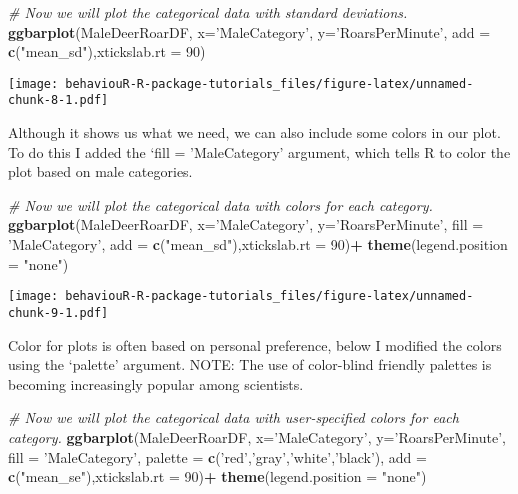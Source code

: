 \documentclass[]{book}
\newenvironment{Shaded}{\begin{snugshade}}{\end{snugshade}}
\newcommand{\CommentTok}[1]{\textcolor[rgb]{0.56,0.35,0.01}{\textit{#1}}}
\newcommand{\DataTypeTok}[1]{\textcolor[rgb]{0.13,0.29,0.53}{#1}}
\newcommand{\DecValTok}[1]{\textcolor[rgb]{0.00,0.00,0.81}{#1}}
\newcommand{\KeywordTok}[1]{\textcolor[rgb]{0.13,0.29,0.53}{\textbf{#1}}}
\newcommand{\NormalTok}[1]{#1}
\newcommand{\OperatorTok}[1]{\textcolor[rgb]{0.81,0.36,0.00}{\textbf{#1}}}
\newcommand{\StringTok}[1]{\textcolor[rgb]{0.31,0.60,0.02}{#1}}
\begin{document}
\begin{Shaded}
\begin{Highlighting}[]
\CommentTok{# Now we will plot the categorical data with standard deviations. }
\KeywordTok{ggbarplot}\NormalTok{(MaleDeerRoarDF, }\DataTypeTok{x=}\StringTok{'MaleCategory'}\NormalTok{, }\DataTypeTok{y=}\StringTok{'RoarsPerMinute'}\NormalTok{, }
          \DataTypeTok{add =} \KeywordTok{c}\NormalTok{(}\StringTok{"mean_sd"}\NormalTok{),}\DataTypeTok{xtickslab.rt =} \DecValTok{90}\NormalTok{)}
\end{Highlighting}
\end{Shaded}

\texttt{[image: behaviouR-R-package-tutorials\_files/figure-latex/unnamed-chunk-8-1.pdf]}

Although it shows us what we need, we can also include some colors in our plot. To do this I added the `fill = 'MaleCategory' argument, which tells R to color the plot based on male categories.

\begin{Shaded}
\begin{Highlighting}[]
\CommentTok{# Now we will plot the categorical data with colors for each category.}
\KeywordTok{ggbarplot}\NormalTok{(MaleDeerRoarDF, }\DataTypeTok{x=}\StringTok{'MaleCategory'}\NormalTok{, }\DataTypeTok{y=}\StringTok{'RoarsPerMinute'}\NormalTok{, }\DataTypeTok{fill =} \StringTok{'MaleCategory'}\NormalTok{,}
          \DataTypeTok{add =} \KeywordTok{c}\NormalTok{(}\StringTok{"mean_sd"}\NormalTok{),}\DataTypeTok{xtickslab.rt =} \DecValTok{90}\NormalTok{)}\OperatorTok{+}\StringTok{ }\KeywordTok{theme}\NormalTok{(}\DataTypeTok{legend.position =} \StringTok{"none"}\NormalTok{)}
\end{Highlighting}
\end{Shaded}

\texttt{[image: behaviouR-R-package-tutorials\_files/figure-latex/unnamed-chunk-9-1.pdf]}

Color for plots is often based on personal preference, below I modified the colors using the `palette' argument.
NOTE: The use of color-blind friendly palettes is becoming increasingly popular among scientists.

\begin{Shaded}
\begin{Highlighting}[]
\CommentTok{# Now we will plot the categorical data with user-specified colors for each category.}
\KeywordTok{ggbarplot}\NormalTok{(MaleDeerRoarDF, }\DataTypeTok{x=}\StringTok{'MaleCategory'}\NormalTok{, }\DataTypeTok{y=}\StringTok{'RoarsPerMinute'}\NormalTok{, }\DataTypeTok{fill =} \StringTok{'MaleCategory'}\NormalTok{,}
          \DataTypeTok{palette =} \KeywordTok{c}\NormalTok{(}\StringTok{'red'}\NormalTok{,}\StringTok{'gray'}\NormalTok{,}\StringTok{'white'}\NormalTok{,}\StringTok{'black'}\NormalTok{),}
          \DataTypeTok{add =} \KeywordTok{c}\NormalTok{(}\StringTok{"mean_se"}\NormalTok{),}\DataTypeTok{xtickslab.rt =} \DecValTok{90}\NormalTok{)}\OperatorTok{+}\StringTok{ }\KeywordTok{theme}\NormalTok{(}\DataTypeTok{legend.position =} \StringTok{"none"}\NormalTok{)}
\end{Highlighting}
\end{Shaded}
\end{document}
